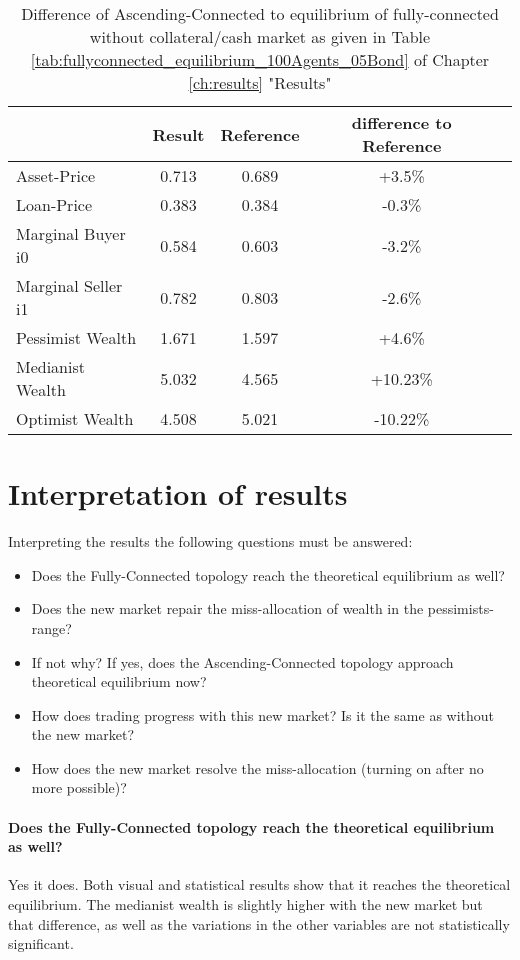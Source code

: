 \documentclass[Bachelorarbeit.tex]{subfiles}
\begin{document}
\begin{table}[H]
	\caption{Difference of Ascending-Connected to equilibrium of fully-connected without collateral/cash market as given in Table \ref{tab:fullyconnected_equilibrium_100Agents_05Bond} of Chapter \ref{ch:results} "Results"}
	\centering
	\begin{tabular} { l c c c r }
		& Result & Reference & difference to Reference \\
		\hline
		Asset-Price & 0.713 & 0.689 & +3.5\% \\
		Loan-Price & 0.383 & 0.384 & -0.3\% \\
		Marginal Buyer i0 & 0.584 & 0.603 & -3.2\% \\
		Marginal Seller i1 & 0.782 & 0.803 & -2.6\% \\
		\hline
		Pessimist Wealth & 1.671 & 1.597 & +4.6\% \\
		Medianist Wealth & 5.032 & 4.565 & +10.23\% \\
		Optimist Wealth & 4.508 & 5.021 & -10.22\% \\
		\hline
	\end{tabular}
\end{table} 

\section{Interpretation of results}
Interpreting the results the following questions must be answered:

\begin{itemize}
\item Does the Fully-Connected topology reach the theoretical equilibrium as well?
\item Does the new market repair the miss-allocation of wealth in the pessimists-range?
\item If not why? If yes, does the Ascending-Connected topology approach theoretical equilibrium now?
\item How does trading progress with this new market? Is it the same as without the new market?
\item How does the new market resolve the miss-allocation (turning on after no more possible)?
\end{itemize}

\paragraph{Does the Fully-Connected topology reach the theoretical equilibrium as well?}
Yes it does. Both visual and statistical results show that it reaches the theoretical equilibrium. The medianist wealth is slightly higher with the new market but that difference, as well as the variations in the other variables are not statistically significant.
\end{document}
